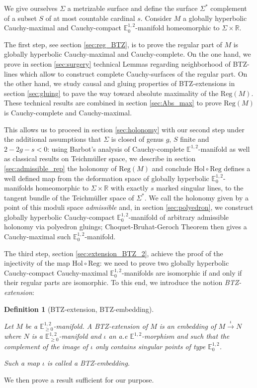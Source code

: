 \documentclass[a4paper,12pt]{article}
\def\RR{\mathbb{R}}
\newcommand{\mass}[1]{{\mathbb E}^{1,2}_{#1}}
\def\Reg{\mathrm{Reg}}
\def\reg{\Reg}
\newtheorem{defou}[lemou]{Definition}    %
\begin{document}
We give ourselves $\Sigma$ a metrizable surface and define the surface $\Sigma^*$ complement of a subset $S$ of at most countable cardinal $s$. 
Consider $M$ a globally hyperbolic Cauchy-maximal and Cauchy-compact $\mass{0}$-manifold homeomorphic to $\Sigma\times \RR$. 

The first step, see section \ref{sec:reg_BTZ}, is to prove the regular part of $M$ is globally hyperbolic Cauchy-maximal and Cauchy-complete.  On the one hand, we prove in section \ref{sec:surgery} technical Lemmas regarding neighborhood of BTZ-lines which allow to construct complete Cauchy-surfaces of the regular part.  On the other hand, we study causal and gluing properties of BTZ-extensions in section \ref{sec:gluing} to pave the way toward absolute maximality of the $\reg(M)$. These technical results are combined in section \ref{sec:Abs_max}  to prove $\reg(M)$ is Cauchy-complete and Cauchy-maximal. 

This allows us to proceed in section \ref{sec:holonomy} with our second step under the additional assumptions that $\Sigma$ is closed of genus $g$, $S$ finite and $2-2g-s<0$: using Barbot's analysis of Cauchy-complete $\mass{}$-manifold as well as classical results on Teichmüller space, we describe in section \ref{sec:admissible_rep} the holonomy of $\reg(M)$ and conclude $\mathrm{Hol}\circ \reg$ defines a well defined map from the deformation space of globally hyperbolic $\mass{0}$-manifolds homeomorphic to  $\Sigma\times \RR$ with exactly $s$ marked singular lines, to the tangent bundle of the Teichmüller space  of $\Sigma^*$.
We call the holonomy given by a point of this moduli space  {\it admissible} and, in section \ref{sec:polyedron}, we construct globally hyperbolic Cauchy-compact $\mass{0}$-manifold of arbitrary admissible holonomy via polyedron gluings; Choquet-Bruhat-Geroch Theorem then gives a Cauchy-maximal such  $\mass{0}$-manifold.

The third step, section \ref{sec:extension_BTZ_2}, achieve the proof of the injectivity of the map $\mathrm{Hol} \circ \reg$: we need to prove  two globally hyperbolic Cauchy-compact Cauchy-maximal $\mass{0}$-manifolds are isomorphic if and only if their regular parts are isomorphic. 
To this end, we introduce the notion {\it BTZ-extension}:

\begin{defou}[BTZ-extension, BTZ-embedding]\label{btzdef:btz_extension_btz_embedding}\

Let $M$ be a $\mass{\geq 0}$-mani\-fold. A  BTZ-extension of  $M$ is an embedding of $M\xrightarrow{\iota} N$ where $N$ is a $\mass{\geq 0}$-manifold and $\iota$ an a.e $\mass{}$-morphism and such that the complement of the image of $\iota$ only contains singular points of type $\mass{0}$.

Such a map $\iota$ is called a BTZ-embedding.
\end{defou}      
 We then prove a result sufficient for our purpose.
 
\end{document}
